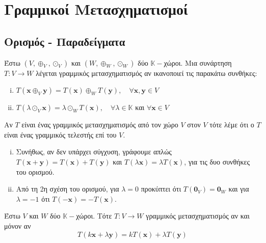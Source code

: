 



\pagestyle{vangelis}




\chapter{Γραμμικοί Μετασχηματισμοί}

\section{Ορισμός - Παραδείγματα}

\begin{dfn}
  Έστω $ (V, \oplus _{V}, \odot _{V}) $ και $ (W, \oplus _{W}, \odot _{W}) $ δύο 
  $ \mathbb{K} - $χώροι. Μια συνάρτηση $ T \colon V \to W $ λέγεται 
  \textcolor{Col1}{γραμμικός μετασχηματισμός} αν ικανοποιεί τις παρακάτω συνθήκες:
  \begin{enumerate}[i)]
    \item $ T(\mathbf{x} \oplus _{V} \mathbf{y}) = T(\mathbf{x}) \oplus _{W}
      T(\mathbf{y}), \quad \forall \mathbf{x}, \mathbf{y}  \in V $
    \item $ T(\lambda \odot _{V} \mathbf{x}) = \lambda \odot _{W} T(\mathbf{x}), 
      \quad \forall \lambda \in \mathbb{K} $ και $ \forall \mathbf{x} \in V $
  \end{enumerate}
  Αν $T$ είναι ένας γραμμικός μετασχηματισμός από τον χώρο $V$ στον $V$ τότε λέμε 
  ότι ο $T$ είναι ένας \textcolor{Col1}{γραμμικός τελεστής} επί του $V$. 
\end{dfn}

\begin{rem}
\item {}
  \begin{enumerate}[i)]
    \item Συνήθως, αν δεν υπάρχει σύγχυση, γράφουμε απλώς $ T(\mathbf{x}+ \mathbf{y}) =
      T(\mathbf{x}) + T(\mathbf{y}) $ και 
      $ T(\lambda \mathbf{x}) = \lambda T(\mathbf{x}) $, για τις δυο συνθήκες 
      του ορισμού.
    \item Από τη 2η σχέση του ορισμού, για $ \lambda = 0 $ προκύπτει ότι 
      $ T(\mathbf{0}_{V}) = \mathbf{0}_{W} $ και για $ \lambda = -1 $ ότι 
      $ T(- \mathbf{x}) = - T(\mathbf{x}) $.
  \end{enumerate}
\end{rem}

\begin{prop}
  Έστω $ V $ και $W$ δύο $ \mathbb{K}- $χώροι. Τότε $ T \colon V \to W $ 
  γραμμικός μετασχηματισμός αν και μόνον αν \[ T(k \mathbf{x} + \lambda \mathbf{y}) = 
  k T(\mathbf{x}) + \lambda T(\mathbf{y}) \]
\end{prop}

